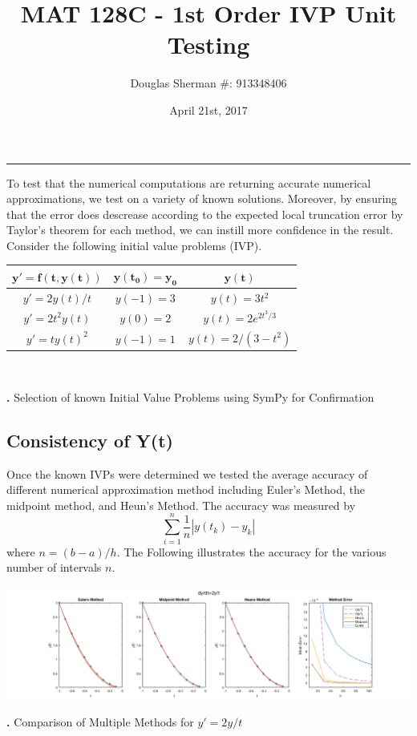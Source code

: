 \documentclass[11.5pt]{article}
\newcommand{\abs}[1]{\left| #1 \right|}
\newcommand{\mbf}[1]{\mathbf{#1}}
\newcounter{graphics}
\newcounter{tables}
\begin{document}
\title{MAT 128C - 1st Order IVP Unit Testing}
\author{Douglas Sherman \#: 913348406}
\date{April 21st, 2017}
\maketitle
\rule{\textwidth}{1pt}
\lstset{style=small} %


To test that the numerical computations are returning accurate numerical approximations, we test on a variety of known solutions. Moreover, by ensuring that the error does descrease according to the expected local truncation error by Taylor's theorem for each method, we can instill more confidence in the result. Consider the following initial value problems (IVP).
\begin{center}
\begin{tabular}{|c|c|c|}
\hline
	$\mbf{y'=f(t,y(t))}$&$\mbf{y(t_0) = y_0}$	&$\mbf{y(t)}$	\\
\hline
	$y' = 2y(t)/t$&$y(-1)=3$	&$y(t) = 3t^2$		\\
\hline
$y' = 2t^2y(t)$	&$y(0) = 2$	&$y(t)=2e^{2t^3/3}$		\\
	\hline
	$y' = ty(t)^2$	&$y(-1) = 1$	&$y(t)=2/(3 - t^2)$		\\
	\hline
\end{tabular}\\
\begin{scriptsize}
{\bf {}.} Selection of known Initial Value Problems using SymPy for Confirmation
\end{scriptsize}
\end{center}

\subsection*{Consistency of Y(t)}
Once the known IVPs were determined we tested the average accuracy of different numerical approximation method including Euler's Method, the midpoint method, and Heun's Method. The accuracy was measured by 
$$\sum_{i=1}^n \frac{1}{n} \abs{y(t_k)-y_k}$$
where $n = (b-a)/h$. The Following illustrates the accuracy for the various number of intervals $n$. 


\begin{center}
\includegraphics[width = 6.5in]{1st.png}\\
\begin{scriptsize}
{\bf {}.} Comparison of Multiple Methods for $y' = 2y/t$
\end{scriptsize}
\end{center}
\end{document}
